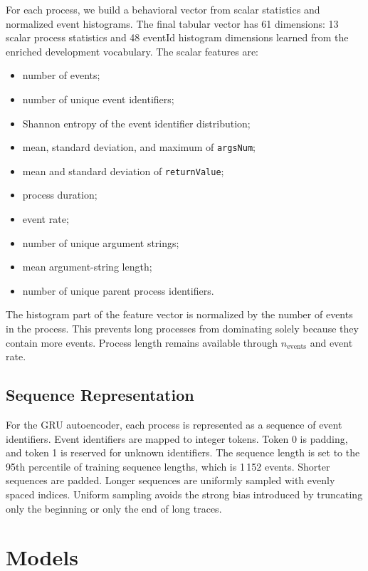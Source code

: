 \documentclass[10pt,journal,compsoc]{IEEEtran}
\begin{document}
For each process, we build a behavioral vector from scalar statistics and normalized event histograms. The final tabular vector has 61 dimensions: 13 scalar process statistics and 48 eventId histogram dimensions learned from the enriched development vocabulary. The scalar features are:
\begin{itemize}
    \item number of events;
    \item number of unique event identifiers;
    \item Shannon entropy of the event identifier distribution;
    \item mean, standard deviation, and maximum of \texttt{argsNum};
    \item mean and standard deviation of \texttt{returnValue};
    \item process duration;
    \item event rate;
    \item number of unique argument strings;
    \item mean argument-string length;
    \item number of unique parent process identifiers.
\end{itemize}

The histogram part of the feature vector is normalized by the number of events in the process. This prevents long processes from dominating solely because they contain more events. Process length remains available through $n_{\text{events}}$ and event rate.

\subsection{Sequence Representation}

For the GRU autoencoder, each process is represented as a sequence of event identifiers. Event identifiers are mapped to integer tokens. Token 0 is padding, and token 1 is reserved for unknown identifiers. The sequence length is set to the 95th percentile of training sequence lengths, which is 1\,152 events. Shorter sequences are padded. Longer sequences are uniformly sampled with evenly spaced indices. Uniform sampling avoids the strong bias introduced by truncating only the beginning or only the end of long traces.

\section{Models}
\label{sec:models}
\end{document}
